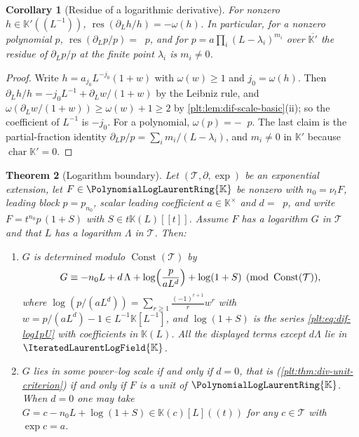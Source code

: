 \documentclass[11pt,oneside]{article}
\theoremstyle{plain}
\newtheorem{theorem}{Theorem}[section]
\newtheorem{corollary}[theorem]{Corollary}
\theoremstyle{definition}
\theoremstyle{remark}
\newcommand{\K}{\mathbb{K}}
\newcommand{\PLlau}{\PolynomialLogLaurentRing{\K}}       %
\newcommand{\PLit}{\IteratedLaurentLogField{\K}}         %
\newcommand{\ordt}{\nu_{t}}                              %
\DeclareMathOperator{\degL}{deg_{L}}
\begin{document}
\begin{corollary}[Residue of a logarithmic derivative]
\label{plt:cor:dif-logderiv-residue}
For nonzero \(h\in\K'((L^{-1}))\), \(\operatorname{res}(\partial_{L}h/h)
=-\omega(h)\).  In particular, for a nonzero polynomial \(p\),
\(\operatorname{res}(\partial_{L}p/p)=\degL p\), and for
\(p=a\prod_{i}(L-\lambda_{i})^{m_{i}}\) over \(\overline{\K'}\) the residue of
\(\partial_{L}p/p\) at the finite point \(\lambda_{i}\) is \(m_{i}\ne0\).
\end{corollary}

\begin{proof}
Write \(h=a_{j_{0}}L^{-j_{0}}(1+w)\) with \(\omega(w)\ge1\) and
\(j_{0}=\omega(h)\).  Then \(\partial_{L}h/h=-j_{0}L^{-1}+\partial_{L}w/(1+w)\)
by the Leibniz rule, and \(\omega(\partial_{L}w/(1+w))\ge\omega(w)+1\ge2\) by
\cref{plt:lem:dif-scale-basic}(ii); so the coefficient of \(L^{-1}\) is
\(-j_{0}\).  For a polynomial, \(\omega(p)=-\degL p\).  The last claim is the
partial-fraction identity \(\partial_{L}p/p=\sum_{i}m_{i}/(L-\lambda_{i})\),
and \(m_{i}\ne0\) in \(\K'\) because \(\operatorname{char}\K'=0\).
\end{proof}

\begin{theorem}[Logarithm boundary]\label{plt:thm:dif-log-boundary}
Let \((\mathcal T,\partial,\exp)\) be an exponential extension, let
\(F\in\PLlau\) be nonzero with \(n_{0}=\ordt F\), leading block
\(p=p_{n_{0}}\), scalar leading coefficient \(a\in\K^{\times}\) and
\(d=\degL p\), and write \(F=t^{n_{0}}p\,(1+S)\) with \(S\in t\K(L)[[t]]\).
Assume \(F\) has a logarithm \(G\) in \(\mathcal T\) and that \(L\) has a
logarithm \(\Lambda\) in \(\mathcal T\).  Then:
\begin{enumerate}
\item \(G\) is determined modulo \(\operatorname{Const}(\mathcal T)\) by
\begin{equation}\label{plt:eq:dif-log-decomposition}
  G\equiv
  -n_{0}L
  +d\,\Lambda
  +\log\Bigl(\frac{p}{aL^{d}}\Bigr)
  +\log(1+S)
  \pmod{\operatorname{Const}(\mathcal T)},
\end{equation}
where \(\log(p/(aL^{d}))=\sum_{r\ge1}\frac{(-1)^{r+1}}{r}w^{r}\) with
\(w=p/(aL^{d})-1\in L^{-1}\K[L^{-1}]\), and \(\log(1+S)\) is the series
\cref{plt:eq:dif-log1pU} with coefficients in \(\K(L)\).  All the displayed
terms except \(d\Lambda\) lie in \(\PLit\).
\item \(G\) lies in some power--log scale if and only if \(d=0\), that is
      (\cref{plt:thm:div-unit-criterion}) if and only if \(F\) is a unit of
      \(\PLlau\).  When \(d=0\) one may take
      \(G=c-n_{0}L+\log(1+S)\in\K(c)[L]((t))\) for any \(c\in\mathcal T\) with
      \(\exp c=a\).
\end{enumerate}
\end{theorem}
\end{document}
